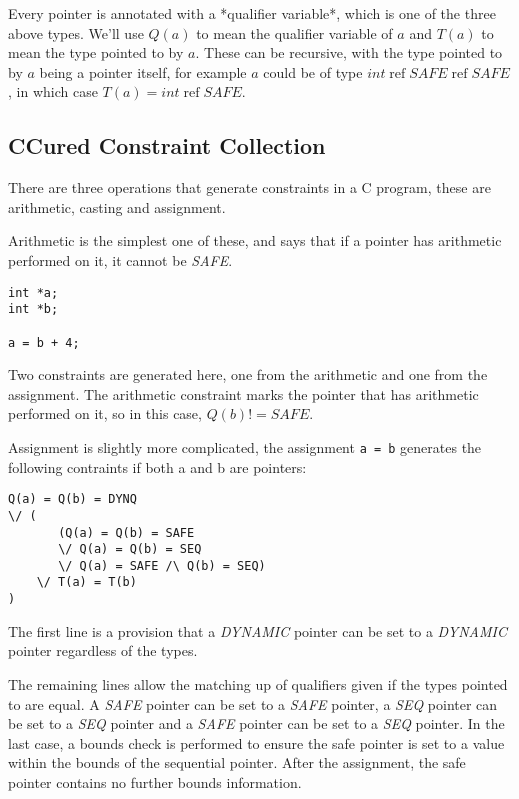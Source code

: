 Every pointer is annotated with a *qualifier variable*, which is one of the three above types.
We'll use $Q(a)$ to mean the qualifier variable of $a$ and $T(a)$ to mean the type pointed to by $a$.
These can be recursive, with the type pointed to by $a$ being a pointer itself, for example $a$ could be of type $int\; \mbox{ref}\; SAFE\; \mbox{ref}\; SAFE$, in which case $T(a) = int\;\mbox{ref}\;SAFE$.

\subsection{CCured Constraint Collection}

There are three operations that generate constraints in a C program, these are arithmetic, casting and assignment.

Arithmetic is the simplest one of these, and says that if a pointer has arithmetic performed on it, it cannot be \textit{SAFE}.

\begin{verbatim}
int *a;
int *b;

a = b + 4;
\end{verbatim}

Two constraints are generated here, one from the arithmetic and one from the assignment.
The arithmetic constraint marks the pointer that has arithmetic performed on it, so in this case, $Q(b) != SAFE$.

Assignment is slightly more complicated, the assignment \verb|a = b| generates the following contraints if both a and b are pointers:

\begin{verbatim}
Q(a) = Q(b) = DYNQ 
\/ (
       (Q(a) = Q(b) = SAFE 
       \/ Q(a) = Q(b) = SEQ
       \/ Q(a) = SAFE /\ Q(b) = SEQ) 
    \/ T(a) = T(b)
)
\end{verbatim}

The first line is a provision that a \textit{DYNAMIC} pointer can be set to a \textit{DYNAMIC} pointer regardless of the types.

The remaining lines allow the matching up of qualifiers given if the types pointed to are equal.
A \textit{SAFE} pointer can be set to a \textit{SAFE} pointer, a \textit{SEQ} pointer can be set to a \textit{SEQ} pointer and a \textit{SAFE} pointer can be set to a \textit{SEQ} pointer.
In the last case, a bounds check is performed to ensure the safe pointer is set to a value within the bounds of the sequential pointer.
After the assignment, the safe pointer contains no further bounds information.

